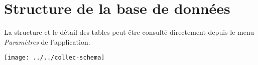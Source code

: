 \chapter{Structure de la base de données}

La structure et le détail des tables peut être consulté directement depuis le menu \textit{Paramètres} de l'application.

\texttt{[image: ../../collec-schema]}
